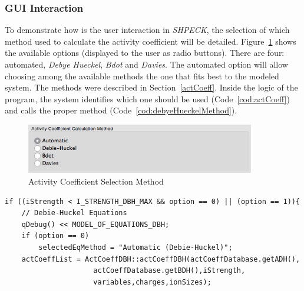 \subsubsection{GUI Interaction}
To demonstrate how is the user interaction in \emph{SHPECK}, the selection of which method used to calculate the activity coefficient will be detailed. Figure~\ref{fig:radioAct} shows the available options (displayed to the user as radio buttons). There are four: automated, \emph{Debye Hueckel}, \emph{Bdot} and \emph{Davies}. The automated option will allow choosing among the available methods the one that fits best to the modeled system. The methods were described in Section~\ref{actCoeff}. Inside the logic of the program, the system identifies which one should be used (Code~\ref{cod:actCoeff}) and calls the proper method (Code~\ref{cod:debyeHueckelMethod}). 

\begin{figure}[ht!]
\centering
\includegraphics[width=100mm]{figures/radioAct.png}
\caption{Activity Coefficient Selection Method}
\label{fig:radioAct}
\end{figure}


\begin{minipage}{0.8\linewidth}
\begin{lstlisting}[frame=single, label=cod:actCoeff, caption=Implementation of the Activity Coefficient calculation method]
if ((iStrength < I_STRENGTH_DBH_MAX && option == 0) || (option == 1)){
    // Debie-Huckel Equations
    qDebug() << MODEL_OF_EQUATIONS_DBH;
    if (option == 0)
        selectedEqMethod = "Automatic (Debie-Huckel)";
    actCoeffList = ActCoeffDBH::actCoeffDBH(actCoeffDatabase.getADH(),
                     actCoeffDatabase.getBDH(),iStrength,
                     variables,charges,ionSizes);

\end{lstlisting}
\end{minipage}

